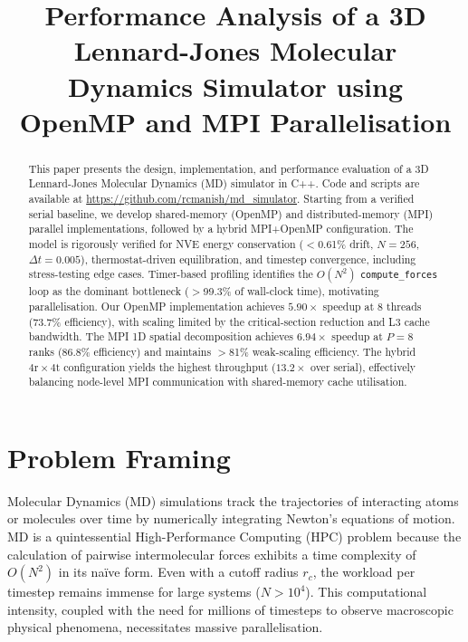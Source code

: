 \documentclass[conference]{IEEEtran}
\begin{document}
\title{Performance Analysis of a 3D Lennard-Jones Molecular Dynamics Simulator
       using OpenMP and MPI Parallelisation}

\author{
}

\maketitle

\begin{abstract}
This paper presents the design, implementation, and performance evaluation of a 3D Lennard-Jones Molecular Dynamics (MD) simulator in C++. Code and scripts are available at \url{https://github.com/rcmanish/md_simulator}. Starting from a verified serial baseline, we develop shared-memory (OpenMP) and distributed-memory (MPI) parallel implementations, followed by a hybrid MPI+OpenMP configuration. The model is rigorously verified for NVE energy conservation ($<$0.61\% drift, $N=256$, $\Delta t=0.005$), thermostat-driven equilibration, and timestep convergence, including stress-testing edge cases. Timer-based profiling identifies the $O(N^2)$ \texttt{compute\_forces} loop as the dominant bottleneck ($>$99.3\% of wall-clock time), motivating parallelisation. Our OpenMP implementation achieves $5.90\times$ speedup at 8 threads (73.7\% efficiency), with scaling limited by the critical-section reduction and L3 cache bandwidth. The MPI 1D spatial decomposition achieves $6.94\times$ speedup at $P=8$ ranks (86.8\% efficiency) and maintains $>$81\% weak-scaling efficiency. The hybrid $4\text{r}\times4\text{t}$ configuration yields the highest throughput ($13.2\times$ over serial), effectively balancing node-level MPI communication with shared-memory cache utilisation.
\end{abstract}

\section{Problem Framing}
Molecular Dynamics (MD) simulations track the trajectories of interacting atoms or molecules over time by numerically integrating Newton's equations of motion. MD is a quintessential High-Performance Computing (HPC) problem because the calculation of pairwise intermolecular forces exhibits a time complexity of $O(N^2)$ in its naïve form. Even with a cutoff radius $r_c$, the workload per timestep remains immense for large systems ($N > 10^4$). This computational intensity, coupled with the need for millions of timesteps to observe macroscopic physical phenomena, necessitates massive parallelisation. 
\end{document}
